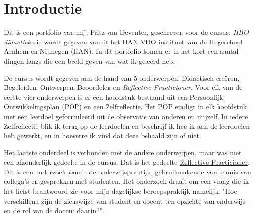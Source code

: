 
\section{Introductie}
Dit is een portfolio van mij, Fritz van Deventer, geschreven voor de cursus: \textit{HBO didactiek} die wordt gegeven vanuit het HAN VDO instituut van de Hogeschool Arnhem en Nijmegen (HAN).
In dit portfolio komen er in het kort een aantal dingen langs die een beeld geven van wat ik geleerd heb.

De cursus wordt gegeven aan de hand van 5 onderwerpen: Didactisch creëren, Begeleiden, Ontwerpen, Beoordelen en \textit{Reflective Practicioner}. Voor elk van de eerste vier onderwerpen is er een hoofdstuk bestaand uit een Persoonlijk Ontwikkelingsplan (POP) en een Zelfreflectie. Het POP eindigt in elk hoofdstuk met een leerdoel geformuleerd uit de observatie van anderen en mijzelf. In iedere Zelfreflectie blik ik terug op de leerdoelen en beschrijf ik hoe ik aan de leerdoelen heb gewerkt, en in hoeverre ik vind dat deze behaald zijn of niet.

Het laatste onderdeel is verbonden met de andere onderwerpen, maar was niet een afzonderlijk gedeelte in de cursus. Dat is het gedeelte \hyperref[sec:RP]{Reflective Practicioner}. Dit is een onderzoek vanuit de onderwijspraktijk, gebruikmakende van kennis van collega's en gesprekken met studenten. Het onderzoek draait om een vraag die ik het liefst beantwoord zie voor mijn dagelijkse beroepspraktijk namelijk: "Hoe verschillend zijn de zienswijze van student en docent ten opzichte van onderwijs en de rol van de docent daarin?".
